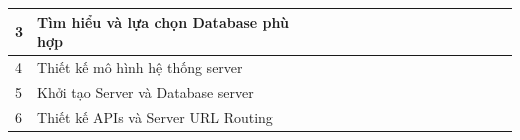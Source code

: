 \begin{landscape}
\begin{table}[]
\begin{tabular}{|l|l|l|l|l|l|l|l|l|l|l|l|l|l|l|l|l|}
3                                           & Tìm hiểu và lựa chọn Database phù hợp                                                                            &                          & \cellcolor[HTML]{000000}                        & \cellcolor[HTML]{000000} &                          &                          &                          &                                                 &                          &                          &                                                 &                          &                          &                          &                          &                          \\ \hline
4                                           & Thiết kế mô hình hệ thống server                                                                                 &                          &                                                 &                          & \cellcolor[HTML]{000000} & \cellcolor[HTML]{000000} &                          &                                                 &                          &                          &                                                 &                          &                          &                          &                          &                          \\ \hline
5                                           & Khởi tạo Server và Database server                                                                               &                          &                                                 &                          &                          & \cellcolor[HTML]{000000} &                          &                                                 &                          &                          &                                                 &                          &                          &                          &                          &                          \\ \hline
6                                           & Thiết kế APIs và Server URL Routing                                                                              &                          &                                                 &                          &                          &                          & \cellcolor[HTML]{000000} &                                                 &                          &                          &                                                 &                          &                          &                          &                          &                          \\ \hline

\end{tabular}
\end{table}
\end{landscape}
